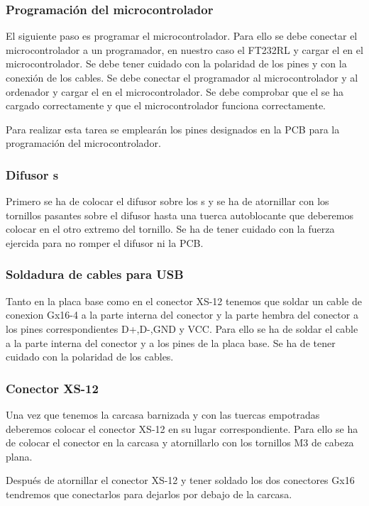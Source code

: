 \subsubsection{Programación del microcontrolador}
El siguiente paso es programar el microcontrolador. Para ello se debe conectar el microcontrolador a un programador, en nuestro caso el FT232RL y cargar el  en el microcontrolador. Se debe tener cuidado con la polaridad de los pines y con la conexión de los cables. Se debe conectar el programador al microcontrolador y al ordenador y cargar el  en el microcontrolador. Se debe comprobar que el  se ha cargado correctamente y que el microcontrolador funciona correctamente.

Para realizar esta tarea se emplearán los pines designados en la \gls{PCB} para la programación del microcontrolador.

\subsubsection{Difusor s}
Primero se ha de colocar el difusor sobre los s y se ha de atornillar con los tornillos pasantes sobre el difusor hasta una tuerca autoblocante que deberemos colocar en el otro extremo del tornillo. Se ha de tener cuidado con la fuerza ejercida para no romper el difusor ni la \gls{PCB}.

\subsubsection{Soldadura de cables para \gls{USB}}
Tanto en la placa base como en el conector XS-12 tenemos que soldar un cable de conexion Gx16-4 a la parte interna del conector y la parte hembra del conector a los pines correspondientes D+,D-,GND y VCC. Para ello se ha de soldar el cable a la parte interna del conector y a los pines de la placa base. Se ha de tener cuidado con la polaridad de los cables.

\subsubsection{Conector XS-12}
Una vez que tenemos la carcasa barnizada y con las tuercas empotradas deberemos colocar el conector XS-12 en su lugar correspondiente. Para ello se ha de colocar el conector en la carcasa y atornillarlo con los tornillos M3 de cabeza plana.

Después de atornillar el conector XS-12 y tener soldado los dos conectores Gx16 tendremos que conectarlos para dejarlos por debajo de la carcasa.

